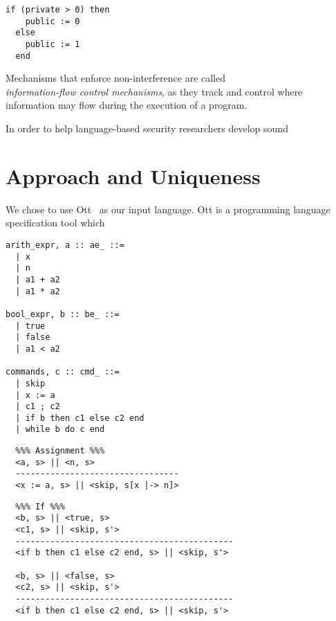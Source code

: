 \documentclass[sigplan,10pt]{acmart}\settopmatter{printfolios=true,printccs=false,printacmref=false}
\begin{document}
\begin{lstlisting}[captionpos=b, caption=Insecure implicit flow, label=listing:implicit-flow]
  if (private > 0) then
    public := 0
  else
    public := 1
  end
\end{lstlisting}
Mechanisms that enforce non-interference are called \\\emph{information-flow control mechanisms}, as they track and control where information may flow during the execution of a program.



In order to help language-based security researchers develop sound




\section{Approach and Uniqueness}
We chose to use Ott~\cite{DBLP:journals/jfp/SewellNOPRSS10} as our input language. Ott is a programming language specification tool which 



\begin{lstlisting}[captionpos=b,caption=Syntax of a simple imperative language]
arith_expr, a :: ae_ ::=
  | x         
  | n                        
  | a1 + a2                  
  | a1 * a2                       

bool_expr, b :: be_ ::=
  | true                        
  | false   
  | a1 < a2          

commands, c :: cmd_ ::=
  | skip    
  | x := a 
  | c1 ; c2           
  | if b then c1 else c2 end
  | while b do c end   
\end{lstlisting}

\begin{lstlisting}
  %%% Assignment %%%
  <a, s> || <n, s>
  ---------------------------------
  <x := a, s> || <skip, s[x |-> n]>
\end{lstlisting}

\begin{lstlisting}
  %%% If %%%
  <b, s> || <true, s>
  <c1, s> || <skip, s'>
  --------------------------------------------
  <if b then c1 else c2 end, s> || <skip, s'>
  
  <b, s> || <false, s>
  <c2, s> || <skip, s'>
  --------------------------------------------
  <if b then c1 else c2 end, s> || <skip, s'>
\end{lstlisting}
\end{document}
